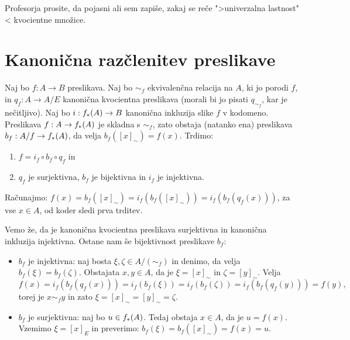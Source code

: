 \begin{opomba}
  Profesorja prosite, da pojasni ali sem zapiše, zakaj se reče ">univerzalna lastnost"< kvocientne množice.
\end{opomba}


\section{Kanonična razčlenitev preslikave}

Naj bo $f : A \to B$ preslikava. Naj bo $\sim_f$ ekvivalenčna relacija na $A$, ki jo porodi
$f$, in $q_f : A \to A/E$ kanonična kvocientna preslikava (morali bi jo pisati $q_{\sim_f}$,
kar je nečitljivo). Naj bo $i : f_{*}(A) \to B$ kanonična inkluzija slike $f$ v kodomeno.
Preslikava $f : A \to f_{*}(A)$ je skladna s $\sim_f$, zato obstaja (natanko ena) preslikava
$b_f : A/f \to f_{*}(A)$, da velja $b_f([x]_\sim) = f(x)$. Trdimo:
%
\begin{enumerate}
\item $f = i_f \circ b_f \circ q_f$ in
\item $q_f$ je surjektivna, $b_f$ je bijektivna in $i_f$ je injektivna.
\end{enumerate}
%
Računajmo: $f(x) = b_f([x]_\sim) = i_f(b_f([x]_\sim)) = i_f(b_f(q_f(x)))$, za vse $x \in A$, od
koder sledi prva trditev.

Vemo že, da je kanonična kvocientna preslikava surjektivna in kanonična inkluzija
injektivna. Ostane nam še bijektivnost preslikave $b_f$:
%
\begin{itemize}
\item $b_f$ je injektivna: naj bosta $\xi, \zeta \in A/(\sim_f)$ in denimo, da velja $b_f(\xi) = b_f(\zeta)$.
  Obstajata $x, y \in A$, da je $\xi = [x]_\sim$ in $\zeta = [y]_\sim$. Velja
  \begin{equation*}
    f(x) = i_f(b_f(q_f(x))) = i_f(b_f(\xi)) = i_f(b_f(\zeta)) = i_f(b_f(q_f(y))) = f(y),
  \end{equation*}
  torej je $x \sim_f y$ in zato $\xi = [x]_\sim = [y]_\sim = \zeta$.

  \item $b_f$ je surjektivna: naj bo $u \in f_{*}(A)$. Tedaj obstaja $x \in A$, da je $u = f(x)$.
  Vzemimo $\xi = [x]_E$ in preverimo: $b_f(\xi) = b_f([x]_\sim) =f(x) = u$.
\end{itemize}